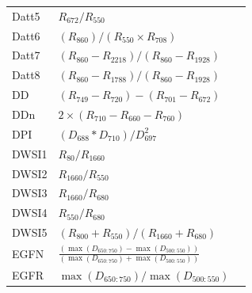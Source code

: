 \documentclass[remotesensing,article,submit,moreauthors,pdftex]{Definitions/mdpi}
\begin{document}
{\begin{supertabular}{lll}
		Datt5           & $R_{672}/R_{550}$                                                                                    & \cite{datt1998}               \\
		Datt6           & $(R_{860})/(R_{550}\times R_{708})$                                                                  & \cite{datt1998}               \\
		Datt7           & $(R_{860} - R_{2218})/(R_{860} - R_{1928})$                                                          & \cite{datt1999a}              \\
		Datt8           & $(R_{860} - R_{1788})/(R_{860} - R_{1928})$                                                          & \cite{datt1999a}              \\
		DD              & $(R_{749}-R_{720})-(R_{701}-R_{672})$                                                                & \cite{maire2004}              \\
		DDn             & $2\times (R_{710}-R_{660}-R_{760})$                                                                  & \cite{lemaire2008}            \\
		DPI             & $(D_{688}*D_{710})/D_{697}^2$                                                                        & \cite{zarco-tejada2003a}      \\
		DWSI1           & $R_{80}/R_{1660}$                                                                                    & \cite{apan2004}               \\
		DWSI2           & $R_{1660}/R_{550}$                                                                                   & \cite{apan2004}               \\
		DWSI3           & $R_{1660}/R_{680}$                                                                                   & \cite{apan2004}               \\
		DWSI4           & $R_{550}/R_{680}$                                                                                    & \cite{apan2004}               \\
		DWSI5           & $(R_{800} + R_{550})/(R_{1660} + R_{680})$                                                           & \cite{apan2004}               \\
		EGFN            & $\frac{(\max(D_{650:750})-\max(D_{500:550}))}{(\max(D_{650:750})+\max(D_{500:550}))}$                & \cite{penuelas1994}           \\
		EGFR            & $\max(D_{650:750})/\max(D_{500:550})$                                                                & \cite{penuelas1994}           \\

\end{supertabular}}
\end{document}

